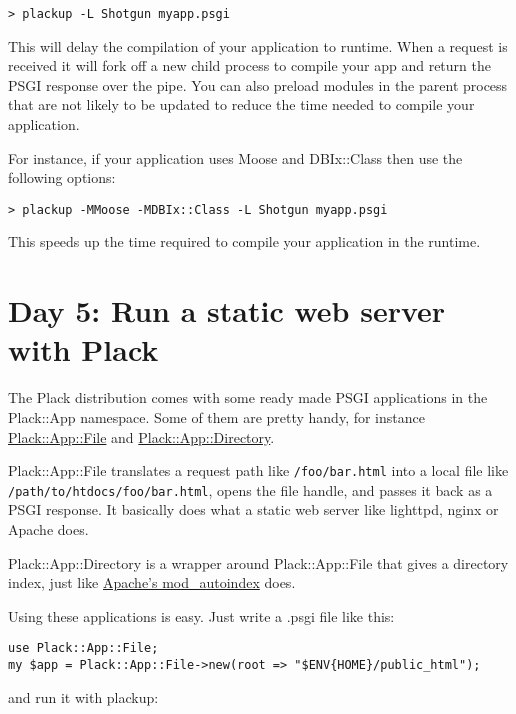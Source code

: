 \begin{lstlisting}
> plackup -L Shotgun myapp.psgi
\end{lstlisting}

This will delay the compilation of your application to runtime. When a
request is received it will fork off a new child process to compile your
app and return the PSGI response over the pipe. You can also preload
modules in the parent process that are not likely to be updated to
reduce the time needed to compile your application.

For instance, if your application uses Moose and DBIx::Class then use
the following options:

\begin{lstlisting}
> plackup -MMoose -MDBIx::Class -L Shotgun myapp.psgi
\end{lstlisting}

This speeds up the time required to compile your application in the
runtime.

\section{Day 5: Run a static web server with
Plack}\label{day-5-run-a-static-web-server-with-plack}

The Plack distribution comes with some ready made PSGI applications in
the Plack::App namespace. Some of them are pretty handy, for instance
\href{http://search.cpan.org/perldoc?Plack::App::File}{Plack::App::File}
and
\href{http://search.cpan.org/perldoc?Plack::App::Directory}{Plack::App::Directory}.

Plack::App::File translates a request path like
\lstinline!/foo/bar.html! into a local file like
\lstinline!/path/to/htdocs/foo/bar.html!, opens the file handle, and
passes it back as a PSGI response. It basically does what a static web
server like lighttpd, nginx or Apache does.

Plack::App::Directory is a wrapper around Plack::App::File that gives a
directory index, just like
\href{http://httpd.apache.org/docs/2.0/mod/mod_autoindex.html}{Apache's
mod\_autoindex} does.

Using these applications is easy. Just write a .psgi file like this:

\begin{lstlisting}
use Plack::App::File;
my $app = Plack::App::File->new(root => "$ENV{HOME}/public_html");
\end{lstlisting}

and run it with plackup:

